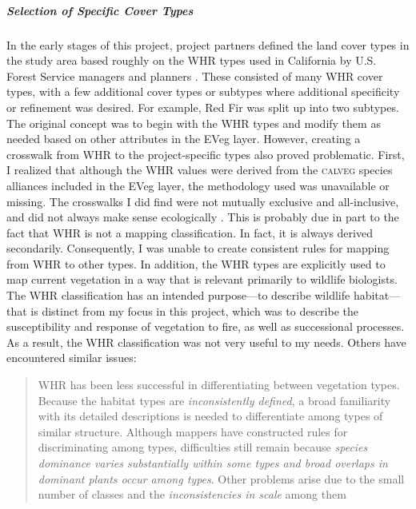 

\subparagraph*{Selection of Specific Cover Types}
In the early stages of this project, project partners defined the land cover types in the study area based roughly on the WHR types used in California by U.S. Forest Service managers and planners \citep{WHR1988}. These consisted of many WHR cover types, with a few additional cover types or subtypes where additional specificity or refinement was desired. For example, Red Fir was split up into two subtypes. The original concept was to begin with the WHR types and modify them as needed based on other attributes in the EVeg layer. However, creating a crosswalk from WHR to the project-specific types also proved problematic. First, I realized that although the WHR values were  derived from the \textsc{calveg} species alliances included in the EVeg layer, the methodology used was unavailable or missing. The crosswalks I did find were not mutually exclusive and all-inclusive, and did not always make sense ecologically \citep{DeBecker1988,Game2005,Keeler-Wolf2007}. This is probably due in part to the fact that WHR is not a mapping classification. In fact, it is always derived secondarily. Consequently, I was unable to create consistent rules for mapping from WHR to other types. In addition, the WHR types are explicitly used to map current vegetation in a way that is relevant primarily to wildlife biologists. The WHR classification has an intended purpose---to describe wildlife habitat---that is distinct from my focus in this project, which was to describe the susceptibility and response of vegetation to fire, as well as successional processes. As a result, the WHR classification was not very useful to my needs. Others have encountered similar issues:
%
\begin{quote}
WHR has been less successful in differentiating between vegetation types. Because the habitat types are \emph{inconsistently defined}, a broad familiarity with its detailed descriptions is needed to differentiate among types of similar structure. Although mappers have constructed rules for discriminating among types, difficulties still remain because \emph{species dominance varies substantially within some types and broad overlaps in dominant plants occur among types}. Other problems arise due to the small number of classes and the \emph{inconsistencies in scale} among them \citep[23, emphasis added]{Keeler-Wolf2007}
\end{quote}

